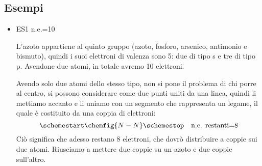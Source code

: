 \subsection{Esempi}
\begin{itemize}
    \item ES1  \quad n.e.=10
    
    L'azoto appartiene al quinto gruppo (azoto, fosforo, arsenico, antimonio e bismuto), quindi i suoi elettroni di valenza sono 5: due di tipo s e tre di tipo p. Avendone due atomi, in totale avremo 10 elettroni.

    Avendo solo due atomi dello stesso tipo, non si pone il problema di chi porre al centro, si possono considerare come due punti uniti da una linea, quindi li mettiamo accanto e li uniamo con un segmento che rappresenta un legame, il quale è costituito da una coppia di elettroni:
    $$\schemestart
    \chemfig{N-N}
    \schemestop 
    \quad 
    \text{n.e. restanti=8}$$
    Ciò significa che adesso restano 8 elettroni, che dovrò distribuire a coppie sui due atomi. Riusciamo a mettere due coppie su un azoto e due coppie sull'altro.


\end{itemize}
